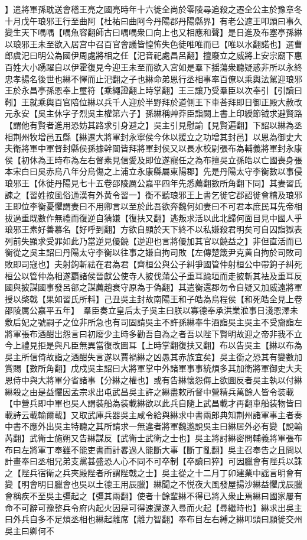 】遣將軍孫耽送會稽王亮之國亮時年十六徙全尚於零陵尋追殺之遷全公主於豫章冬十月戊午琅邪王行至曲阿【杜祐曰曲阿今丹陽郡丹陽縣界】有老公遮王叩頭曰事久變生天下喁喁【喁魚容翻師古曰喁喁衆口向上也又相應和聲】是日進及布塞亭孫綝以琅邪王未至欲入居宫中召百官會議皆惶怖失色徒唯唯而已【唯以水翻諾也】選曹郎虞汜曰明公為國伊周處將相之任【汜音祀處昌呂翻】擅廢立之威將上安宗廟下惠百姓大小踴躍自以伊霍復見今迎王未至而欲入宮如是羣下揺蕩衆聽疑惑非所以永終忠孝揚名後世也綝不懌而止汜翻之子也綝命弟恩行丞相事率百僚以乘輿法駕迎琅邪王於永昌亭孫恩奉上璽符【乘繩證翻上時掌翻】王三讓乃受羣臣以次奉引【引讀曰靷】王就乘輿百官陪位綝以兵千人迎於半野拜於道側王下車荅拜即日御正殿大赦改元永安【吳主休字子烈吳主權第六子】孫綝稱艸莽臣詣闕上書上印綬節钺求避賢路【謂他有賢者進用恐妨其路求引身避之】吳主引見慰諭【見賢遍翻】下詔以綝為丞相荆州牧增邑五縣【綝遷大將軍封永寧侯今休以援立之功增其封邑】以恩為御史大夫衛將軍中軍督封縣侯孫據幹闓皆拜將軍封侯又以長水校尉張布為輔義將軍封永康侯【初休為王時布為左右督素見信愛及即位遂寵任之為布擅吳立孫皓以亡國喪身張本宋白曰吳赤烏八年分烏傷之上浦立永康縣屬東陽郡】先是丹陽太守李衡數以事侵琅邪王【休徙丹陽見七十五卷邵陵厲公嘉平四年先悉薦翻數所角翻下同】其妻習氏諫之【習姓按風俗通漢有外黄令習一】衡不聽琅邪王上書乞徙它郡詔徙會稽及琅邪王即位李衡憂懼謂妻曰不用卿言以至於此吾欲奔魏何如妻曰不可君本庶民耳先帝相拔過重既數作無禮而復逆自猜嫌【復扶又翻】逃叛求活以此北歸何面目見中國人乎琅邪王素好善慕名【好呼到翻】方欲自顯於天下終不以私嫌殺君明矣可自囚詣獄表列前失顯求受罪如此乃當逆見優饒【逆迎也言將優加其官以饒益之】非但直活而已衡從之吳主詔曰丹陽太守李衡以往事之嫌自拘司敗【左傳楚箴尹克黄自拘於司敗司敗即司寇也】夫射鉤斬祛在君為君【齊桓公與公子糾爭國管仲射桓公中帶鉤子糾死桓公以管仲為相遂覇諸侯晉獻公使寺人披伐蒲公子重耳踰垣而走披斬其袪及重耳反國與披謀國事發呂郤之謀薦趙衰守原為于偽翻】其遣衡還郡勿令自疑又加威遠將軍授以棨戟【果如習氏所料】己丑吳主封故南陽王和子皓為烏程侯【和死皓全見上卷邵陵厲公嘉平五年】　羣臣奏立皇后太子吳主曰朕以寡德奉承洪業涖事日淺恩澤未敷后妃之號嗣子之位非所急也有司固請吳主不許孫綝奉牛酒詣吳主吳主不受齎詣左將軍張布酒酣出怨言曰初廢少主時多勸吾自為之者吾以陛下賢明故迎之帝非我不立今上禮見拒是與凡臣無異當復改圖耳【上時掌翻復扶又翻】布以告吳主【綝以布為吳主所信倚故詣之酒酣失言遂以賈禍綝之凶愚其赤族宜矣】吳主銜之恐其有變數加賞賜【數所角翻】戊戍吳主詔曰大將軍掌中外諸軍事事統煩多其加衛將軍御史大夫恩侍中與大將軍分省諸事【分綝之權也】或有告綝懷怨侮上欲圖反者吳主執以付綝綝殺之由是益懼因孟宗求出屯武昌吳主許之綝盡敕所督中營精兵萬餘人皆令装載【中營兵即中軍也吳人謂装船為装載綝欲以此兵自隨上武昌載才再翻車船装物皆曰載詩云載輸爾載】又取武庫兵器吳主咸令給與綝求中書兩郎典知荆州諸軍事主者奏中書不應外出吳主特聽之其所請求一無違者將軍魏邈說吳主曰綝居外必有變【說輸芮翻】武衛士施朔又告綝謀反【武衛士武衛之士也】吳主將討綝密問輔義將軍張布布曰左將軍丁奉雖不能吏書而計畧過人能斷大事【斷丁亂翻】吳主召奉告之且問以計畫奉曰丞相兄弟支黨甚盛恐人心不同不可卒制【卒讀曰猝】可因臘會有陛兵以誅之【陛兵宿衛之兵夾殿陛者所謂陛戟之士】吳主從之十二月丁卯建業中謡言明會有變【明會明日臘會也吳以土德王用辰臘】綝聞之不悦夜大風發屋揚沙綝益懼戊辰臘會稱疾不至吳主彊起之【彊其兩翻】使者十餘輩綝不得已將入衆止焉綝曰國家屢有命不可辭可豫整兵令府内起火因是可得速還遂入尋而火起【尋繼時也】綝求出吳主曰外兵自多不足煩丞相也綝起離席【離力智翻】奉布目左右縛之綝叩頭曰願徙交州吳主曰卿何不